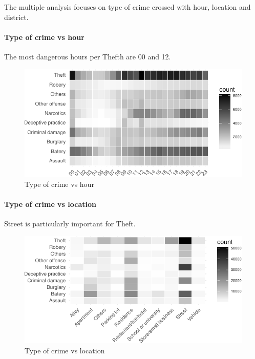 \documentclass[]{article}
\let\oldparagraph\paragraph
\renewcommand{\paragraph}[1]{\oldparagraph{#1}\mbox{}}
\begin{document}
The multiple analysis focuses on type of crime crossed with hour,
location and district.

\paragraph{Type of crime vs hour}\label{type-of-crime-vs-hour}

The most dangerous hours per Thefth are 00 and 12.

\begin{figure}[htbp]
\centering
\includegraphics{Assessment_1v6_files/figure-latex/fig9-1.pdf}
\caption{Type of crime vs hour}
\end{figure}

\paragraph{Type of crime vs location}\label{type-of-crime-vs-location}

Street is particularly important for Theft.

\begin{figure}[htbp]
\centering
\includegraphics{Assessment_1v6_files/figure-latex/fig11-1.pdf}
\caption{Type of crime vs location}
\end{figure}
\end{document}
